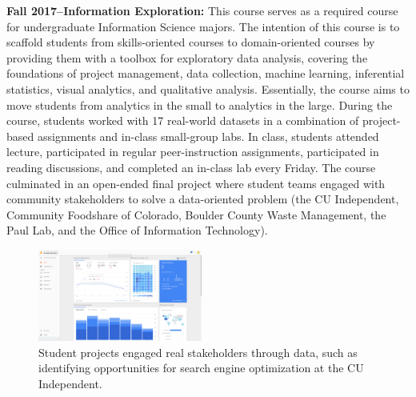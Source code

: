 \documentclass[11pt]{article}
\begin{document}
\textbf{Fall 2017--Information Exploration: } 
This course serves as a required course for undergraduate Information Science majors. The intention of this course is to scaffold students from skills-oriented courses to domain-oriented courses by providing them with a toolbox for exploratory data analysis, covering the foundations of project management, data collection, machine learning, inferential statistics, visual analytics, and qualitative analysis. Essentially, the course aims to move students from analytics in the small to analytics in the large. During the course, students worked with 17 real-world datasets in a combination of project-based assignments and in-class small-group labs. In class, students attended lecture, participated in regular peer-instruction assignments, participated in reading discussions, and completed an in-class lab every Friday. The course culminated in an open-ended final project where student teams engaged with community stakeholders to solve a data-oriented problem (the CU Independent, Community Foodshare of Colorado, Boulder County Waste Management, the Paul Lab, and the Office of Information Technology). 

\begin{figure}
	\begin{center}
		\includegraphics[width=0.48\textwidth]{3401_example}
	\end{center}
	\caption{Student projects engaged real stakeholders through data, such as identifying opportunities for search engine optimization at the CU Independent.}
\end{figure}
\end{document}
